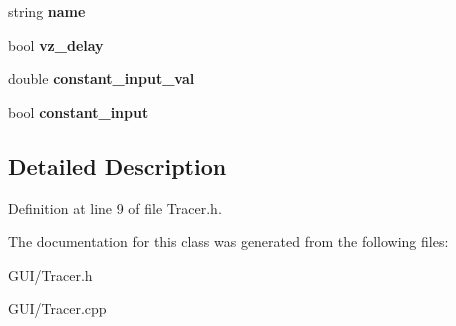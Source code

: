 \begin{DoxyCompactItemize}
\mbox{\label{class_c_tracer_ad457e1f102f72bbebe3f517c008a1407}} 
string {\bfseries name}
\item 
\mbox{\label{class_c_tracer_ad104988fa3bbf34d4758bc350aac8ffe}} 
bool {\bfseries vz\+\_\+delay}
\item 
\mbox{\label{class_c_tracer_a703bdd42ec5892d28e9dad6e59d8a548}} 
double {\bfseries constant\+\_\+input\+\_\+val}
\item 
\mbox{\label{class_c_tracer_ae444b2364685de057484e31564e8a5ff}} 
bool {\bfseries constant\+\_\+input}
\end{DoxyCompactItemize}


\subsection{Detailed Description}


Definition at line 9 of file Tracer.\+h.



The documentation for this class was generated from the following files\+:\begin{DoxyCompactItemize}
\item 
G\+U\+I/Tracer.\+h\item 
G\+U\+I/Tracer.\+cpp\end{DoxyCompactItemize}
